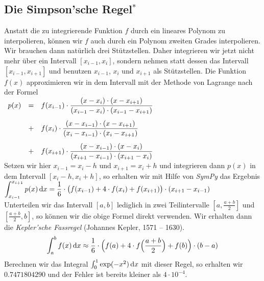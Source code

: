\subsection{Die Simpson'sche Regel$^*$}
Anstatt die zu integrierende Funktion $f$ durch ein lineares Polynom zu interpolieren,
k\"onnen wir $f$ auch durch ein Polynom zweiten Grades interpolieren.  Wir brauchen dann
nat\"urlich drei St\"utzstellen. Daher integrieren wir jetzt nicht mehr \"uber ein Intervall
$[x_{i-1},x_i]$, sondern nehmen statt dessen das Intervall $[x_{i-1},x_{i+1}]$ und
benutzen $x_{i-1}$, $x_i$ und $x_{i+1}$ als St\"utzstellen.
Die Funktion $f(x)$ approximieren wir in dem Intervall mit der Methode von Lagrange nach
der Formel
\\[0.2cm]
\hspace*{1.3cm}
$
\begin{array}[t]{lcl}
p(x) & = & \displaystyle f(x_{i-1})\cdot \frac{(x-x_i)\cdot (x-x_{i+1})}{(x_{i-1}-x_i)\cdot (x_{i-1}-x_{i+1})}  \\[0.5cm]
     & + & \displaystyle f(x_{i})\cdot \frac{(x-x_{i-1})\cdot (x-x_{i+1})}{(x_{i}-x_{i-1})\cdot (x_{i}-x_{i+1})}  \\[0.5cm]
     & + & \displaystyle f(x_{i+1})\cdot \frac{(x-x_{i-1})\cdot (x-x_{i})}{(x_{i+1}-x_{i-1})\cdot (x_{i+1}-x_{i})}
\end{array}$
\\[0.2cm]
Setzen wir hier $x_{i-1}= x_i-h$ und $x_{i+1}= x_i+h$ und
integrieren dann $p(x)$ in dem Intervall $[x_{i}-h,x_{i}+h]$, so erhalten wir mit Hilfe von \textsl{SymPy} das Ergebnis 
\\[0.2cm]
\hspace*{1.3cm}
$\displaystyle \int_{x_{i-1}}^{x_{i+1}} p(x)\,\textrm{d} x = \frac{1}{6}\cdot \bigl(f(x_{i-1}) + 4 \cdot  f(x_i) + f(x_{i+1})\bigr)\cdot (x_{i+1}-x_{i-1})$
\\[0.2cm]
Unterteilen wir das Intervall $[a,b]$ lediglich in zwei Teilintervalle $[a,\frac{a+b}{2}]$
und $[\frac{a+b}{2},b]$, so k\"onnen wir die obige Formel direkt verwenden.  Wir erhalten
dann die \emph{Kepler'sche Fassregel} (Johannes Kepler, 1571 -- 1630).
\begin{equation}
  \label{eq:keplerFass}
  \int_a^b f(x)\,\textrm{d} x \approx \frac{1}{6} \cdot \Bigl( f(a) + 4 \cdot f\Bigl(\frac{a+b}{2}\Bigr) + f(b)\Bigr)\cdot (b-a)
\end{equation}
Berechnen wir das Integral $\int_0^1 \exp(-x^2)\, \textrm{d} x$ mit dieser Regel, so erhalten wir 
$0.7471804290$ und der Fehler ist bereits kleiner als $4 \cdot 10^{-4}$.

